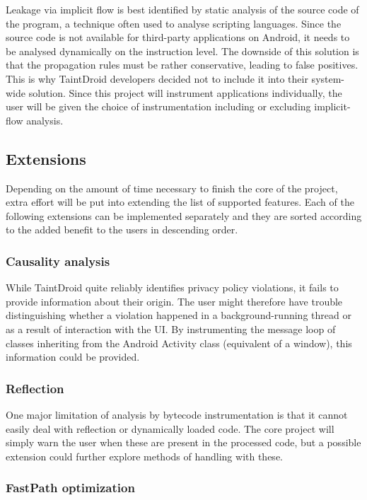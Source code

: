 \documentclass[12pt]{article}
\begin{document}
Leakage via implicit flow is best identified by static analysis of the 
source code of the program, a technique often used to analyse scripting
languages. Since the source code is not available for third-party 
applications on Android, it needs to be analysed dynamically on the 
instruction level. The downside of this solution is that the propagation 
rules must be rather conservative, leading to false positives. This is 
why TaintDroid developers decided not to include it into their
system-wide solution. Since this project will instrument applications
individually, the user will be given the choice of instrumentation 
including or excluding implicit-flow analysis.

\subsection*{Extensions}

Depending on the amount of time necessary to finish the core of the project,
extra effort will be put into extending the list of supported features. Each 
of the following extensions can be implemented separately and they are 
sorted according to the added benefit to the users in descending order.

\subsubsection*{Causality analysis}

While TaintDroid quite reliably identifies privacy policy violations,
it fails to provide information about their origin. The user might therefore 
have trouble distinguishing whether a violation happened in a 
background-running thread or as a result of interaction with the UI. 
By instrumenting the message loop of classes inheriting from the Android 
Activity class (equivalent of a window), this information could be provided.

\subsubsection*{Reflection}

One major limitation of analysis by bytecode instrumentation is that it 
cannot easily deal with reflection or dynamically loaded code. The core
project will simply warn the user when these are present in the processed
code, but a possible extension could further explore methods of handling 
with these.

\subsubsection*{FastPath optimization}
\end{document}
